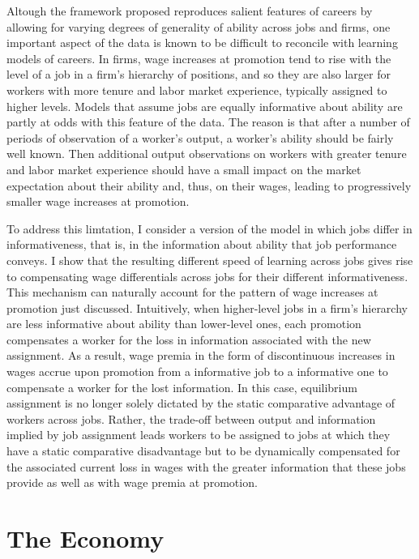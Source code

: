 \documentclass[12pt]{article}
\newcommand{\highlightB}[1]{{\emph{\color{MyBlue}{#1}}}}
\newcommand{\highlightP}[1]{{\emph{\color{MyPink}{#1}}}}
\theoremstyle{definition}
\begin{document}
Altough the framework proposed reproduces salient features of careers by allowing for varying degrees of generality of ability across jobs and firms, one important aspect of the data is known to be difficult to reconcile with learning models of careers. In firms, wage increases at promotion tend to rise with the level of a job in a firm's hierarchy of positions, and so they are also larger for workers with more tenure and labor market experience, typically assigned to higher levels. Models that assume jobs are equally informative about ability are partly at odds with this feature of the data. The reason is that after a number of periods of observation of a worker's output, a worker's ability should be fairly well known. Then additional output observations on workers with greater tenure and labor market experience should have a small impact on the market expectation about their ability and, thus, on their wages, leading to progressively smaller wage increases at promotion. 

To address this limtation, I consider a \highlightB{differential learning} version of the model in which jobs differ in informativeness, that is, in the information about ability that job performance conveys. I show that the resulting different speed of learning across jobs gives rise to compensating wage differentials across jobs for their different informativeness. This mechanism can naturally account for the pattern of wage increases at promotion just discussed. Intuitively, when higher-level jobs in a firm's hierarchy are less informative about ability than lower-level ones, each promotion compensates a worker for the loss in information associated with the new assignment. As a result, wage premia in the form of discontinuous increases in wages accrue upon promotion from a \highlightP{more} informative job to a \highlightP{less} informative one to compensate a worker for the lost information. In this case, equilibrium assignment is no longer solely dictated by the static comparative advantage of workers across jobs. Rather, the trade-off between output and information implied by job assignment leads workers to be assigned to jobs at which they have a static comparative disadvantage but to be dynamically compensated for the associated current loss in wages with the greater information that these jobs provide as well as with wage premia at promotion.

\section{The Economy}
\end{document}
